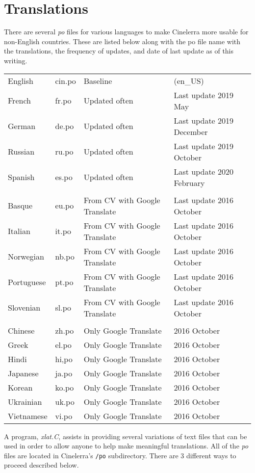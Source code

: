 \chapter{Translations}%
\label{cha:translations}

There are several \textit{po} files for various languages to make Cinelerra more usable for non-English 
countries.  These are listed below along with the po file name with the translations, the frequency
of updates, and date of last update as of this writing.

\begin{tabular}{llll}
\hline
	English& cin.po& Baseline &(en\_US) \\
	French&	fr.po&	Updated often& Last update 2019 May\\
	German&  de.po&	Updated often& Last update 2019 December\\
	Russian& ru.po&	Updated often& Last update 2019 October\\
	Spanish& es.po& Updated often& Last update 2020 February\\
\\
	Basque& eu.po&	From CV with Google Translate & Last update 2016 October\\
	Italian&it.po&	From CV with Google Translate & Last update 2016 October\\
	Norwegian& nb.po& From CV with Google Translate & Last update 2016 October\\ 
	Portuguese& pt.po& From CV with Google Translate& Last update 2016 October \\
	Slovenian& sl.po & From CV with Google Translate& Last update 2016 October \\
\\
	Chinese& zh.po&	Only Google Translate & 2016 October\\
	Greek&	el.po& Only Google Translate & 2016 October\\
	Hindi& hi,po& Only Google Translate & 2016 October\\
	Japanese& ja.po& Only Google Translate & 2016 October \\
	Korean& ko.po& Only Google Translate	& 2016 October \\
	Ukrainian& uk.po & Only Google Translate & 2016 October \\
	Vietnamese& vi.po& Only Google Translate & 2016 October \\
\hline
\end{tabular}

A program, \textit{xlat.C}, assists in providing several variations of text files that can be used in order to allow anyone to help make meaningful translations.  All of the \textit{po} files are located in Cinelerra’s \texttt{/po} subdirectory. There are 3 different ways to proceed described below.

